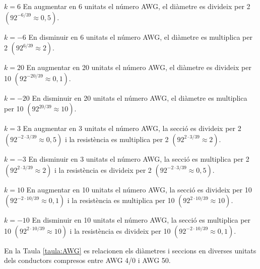 \begin{list}{}
   {\setlength{\labelwidth}{15mm} \setlength{\leftmargin}{17mm} \setlength{\labelsep}{2mm}}

   \item[$k=6$\hfill] En augmentar en 6  unitats el n\'{u}mero AWG, el di\`{a}metre es divideix per 2
                 $(92^{-6/39}\approx 0{,}5)$.

   \item[$k=-6$\hfill] En disminuir en 6 unitats el n\'{u}mero AWG, el di\`{a}metre es multiplica per 2
                 $(92^{6/39}\approx 2)$.

   \item[$k=20$\hfill] En augmentar en 20  unitats el n\'{u}mero AWG, el di\`{a}metre es divideix per 10
                 $(92^{-20/39}\approx 0{,}1)$.

   \item[$k=-20$\hfill] En disminuir en 20 unitats el n\'{u}mero AWG, el di\`{a}metre es multiplica per 10
                 $(92^{20/39}\approx 10)$.

   \item[$k=3$\hfill] En augmentar en 3 unitats el n\'{u}mero AWG, la secci\'{o} es divideix per 2
                 $(92^{-2\cdot3/39}\approx 0{,}5)$ i la resist\`{e}ncia es multiplica per 2
                 $(92^{2\cdot3/39}\approx 2)$.

   \item[$k=-3$\hfill] En disminuir en 3 unitats el n\'{u}mero AWG, la secci\'{o} es multiplica per 2
                  $(92^{2\cdot3/39}\approx 2)$ i la resist\`{e}ncia es divideix per 2
                  $(92^{-2\cdot3/39}\approx 0{,}5)$.

   \item[$k=10$\hfill] En augmentar en 10 unitats el n\'{u}mero AWG, la secci\'{o} es divideix per 10
                 $(92^{-2\cdot10/39}\approx 0{,}1)$ i la resist\`{e}ncia es multiplica per 10
                 $(92^{2\cdot10/39}\approx 10)$.

   \item[$k=-10$\hfill] En disminuir en 10 unitats el n\'{u}mero AWG, la secci\'{o} es multiplica per 10
                  $(92^{2\cdot10/39}\approx 10)$ i la resist\`{e}ncia es divideix per 10
                  $(92^{-2\cdot10/39}\approx 0{,}1)$.
\end{list}

En la Taula \vref{taula:AWG} es relacionen els di\`{a}metres i seccions en diverses unitats dels conductors compresos entre AWG 4/0 i AWG 50.



